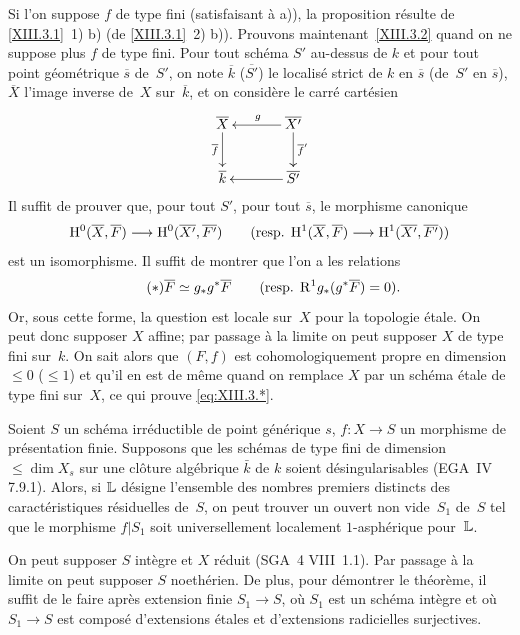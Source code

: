 Si l'on suppose $f$ de type fini (\resp satisfaisant \`a a)), la
proposition r\'esulte de \ref{XIII.3.1}~1) b) (\resp de
\ref{XIII.3.1}~2) b)). Prouvons maintenant~\ref{XIII.3.2} quand on ne
suppose plus $f$ de type fini. Pour tout sch\'ema $S'$ au-dessus de
$k$ et pour tout point g\'eom\'etrique $\overline{s}$ de~$S'$, on
note $\overline{k}$ (\resp $\overline{S'}$) le localis\'e strict de
$k$ en $\overline{s}$ (\resp de~$S'$ en $\overline{s}$),
$\overline{X}$ l'image inverse de~$X$ sur~$\overline{k}$, et on
consid\`ere le carr\'e cart\'esien
$$
\xymatrix@C=1.2cm{{\overline{X}}\ar[d]_-{\overline{f}}&{\overline{X'}}\ar[l]_g\ar[d]^-{\overline{f}'}\\{\overline{k}}&{\overline{S'}}\ar[l]}
$$
Il suffit de prouver que, pour tout $S'$, pour tout $\overline{s}$, le
morphisme canonique
$$
\H^0(\overline{X},\overline{F})\to
\H^0(\overline{X'},\overline{F'})\qquad
\text{(\resp $\H^1(\overline{X},\overline{F})\to
\H^1(\overline{X'},\overline{F'})$)}
$$
est un isomorphisme. Il suffit de montrer que l'on a les relations
\begin{equation*}
\label{eq:XIII.3.*}
\tag{$*$} \overline{F}\simeq g_*g^*\overline{F}\qquad
\text{(resp.\space$\mathrm{R}^1g_*(g^*\overline{F})=0$).}
\end{equation*}
Or, sous cette forme, la question est locale sur~$X$ pour la topologie
\'etale. On peut donc supposer $X$ affine; par passage \`a la
limite on peut supposer $X$ de type fini sur~$k$. On sait alors que
$(F,f)$ est cohomologiquement propre en dimension $\leq 0$
(\resp $\leq 1$) et qu'il en est de m\^eme quand on remplace $X$ par
un sch\'ema \'etale de type fini sur~$X$, ce qui prouve
\eqref{eq:XIII.3.*}.

\begin{theoreme}
\label{XIII.3.3}
Soient $S$ un sch\'ema irr\'eductible de point g\'en\'erique
$s$, $f\colon X\to S$ un morphisme de pr\'esentation
finie. Supposons que les sch\'emas de type fini de dimension
$\leqslant\dim X_s$ sur une cl\^oture alg\'ebrique $\bar{k}$ de
$k$ soient d\'esingularisables \textup{(EGA~IV 7.9.1)}. Alors, si $\mathbb{L}$
d\'esigne l'ensemble des nombres premiers distincts des
caract\'eristiques r\'esiduelles de~$S$, on peut trouver un ouvert
non vide~$S_1$ de~$S$ tel que le morphisme $f|S_1$ soit
universellement localement $1$-asph\'erique pour~$\mathbb{L}$.
\end{theoreme}

On peut supposer $S$ int\`egre et $X$ r\'eduit (SGA~4
VIII~1.1). Par passage \`a la limite on peut supposer $S$
noeth\'erien. De plus, pour d\'emontrer le th\'eor\`eme, il
suffit de le faire apr\`es extension finie $S_1\to S$, o\`u $S_1$
est un sch\'ema int\`egre et o\`u $S_1\to S$ est compos\'e
d'extensions \'etales et d'extensions radicielles surjectives.


